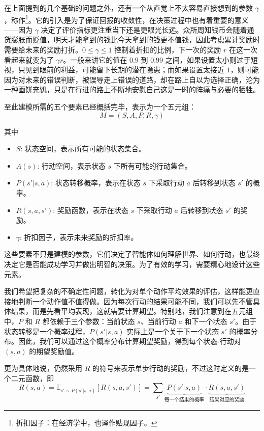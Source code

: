 在上面提到的几个基础的问题之外，还有一个从直觉上不太容易直接想到的参数 $\gamma$，称作\footnote{折扣因子：在经济学中，也译作贴现因子。}。它的引入是为了保证回报的收敛性，在决策过程中也有着重要的意义——因为 $\gamma$ 决定了评价指标更注重当下还是更眼光长远。众所周知钱币会随着通货膨胀而贬值，明天才能拿到的钱比今天拿到的钱更不值钱，因此考虑累计奖励时需要给未来的奖励打折。$0 \le \gamma \le 1$ 控制着折扣的比例，下一次的奖励 $r$ 在这一次看起来就变为了 $\gamma r$。一般来讲它的值在 $0.9$ 到 $0.99$ 之间，如果设置太小则过于短视，只见到眼前的利益，可能留下长期的潜在隐患；而如果设置太接近 $1$，则可能因为对未来的错误判断，被误导走上错误的道路，却在路上自以为选择正确，沦为一种画饼充饥，只是在行进的路上不断地安慰自己这是一时的阵痛与必要的牺牲。

至此建模所需的五个要素已经概括完毕，表示为一个五元组：
\[
    M = (S, A, P, R, \gamma)
\]

其中
\begin{itemize}
    \item $S$: 状态空间，表示所有可能的状态集合。
    \item $A(s)$: 行动空间，表示状态 $s$ 下所有可能的行动集合。
    \item $P(s' | s, a)$: 状态转移概率，表示在状态 $s$ 下采取行动 $a$ 后转移到状态 $s'$ 的概率。
    \item $R(s, a, s')$: 奖励函数，表示在状态 $s$ 下采取行动 $a$ 后转移到状态 $s'$ 的奖励。
    \item $\gamma$: 折扣因子，表示未来奖励的折扣率。
\end{itemize}

这些要素不只是建模的参数，它们决定了智能体如何理解世界、如何行动，也最终决定它是否能成功学习并做出明智的决策。为了有效的学习，需要精心地设计这些元素。

我们希望把复杂的不确定性问题，转化为对单个动作平均效果的评估，这样能更直接地判断一个动作值不值得做。因为每次行动的结果可能不同，我们可以先不管具体结果，而是先看平均表现，这就需要计算期望。特别地，我们注意到在五元组中，$P$ 和 $R$ 都依赖于三个参数：当前状态 $s$、当前行动 $a$ 和下一个状态 $s'$。由于状态转移是一个概率过程，$P(s' | s, a)$ 实际上是一个关于下一个状态 $s'$ 的概率分布。因此，我们可以通过这个概率分布计算期望奖励，得到每个状态-行动对 $(s, a)$ 的期望奖励值。

更为具体地说，仍然采用 $R$ 的符号来表示单步行动的奖励，不过这时定义的是一个二元函数，即
\[
    R(s, a) = \mathbb{E}_{s' \sim P(s' | s, a)}[R(s, a, s')] = \sum_{s'} \underset{\text{每一个结果的概率}}{\underbrace{P(s' | s, a)}} \cdot \underset{\text{结果对应的奖励}}{\underbrace{R(s, a, s')}}
\]

